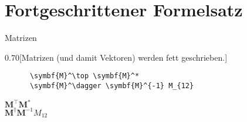 \section{Fortgeschrittener Formelsatz}

\begin{frame}[fragile]{
  Matrizen
  \hfill{}
}
\begin{CodeExample}{0.70}[Matrizen (und damit Vektoren) werden fett geschrieben.]
    \begin{lstlisting}
      \symbf{M}^\top \symbf{M}^*
      \symbf{M}^\dagger \symbf{M}^{-1} M_{12}
    \end{lstlisting}
  \CodeResult
    $\symbf{M}^\top \symbf{M}^*$ \\
    $\symbf{M}^\dagger \symbf{M}^{-1} M_{12}$
  \end{CodeExample}


\end{frame}

